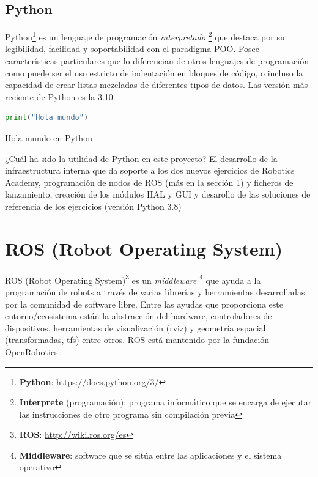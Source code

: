 \subsection{Python}
\label{subsec:python}

Python\footnote{\textbf{Python}: \url{https://docs.python.org/3/}} es un lenguaje de programación \textit{interpretado} \footnote{\textbf{Interprete} (programación): programa informático que se encarga de ejecutar las instrucciones de otro programa sin compilación previa} que destaca por su legibilidad, facilidad y soportabilidad con el paradigma POO. Posee características particulares que lo diferencian de otros lenguajes de programación como puede ser el uso estricto de indentación en bloques de código, o incluso la capacidad de crear listas mezcladas de diferentes tipos de datos. Las versión más reciente de Python es la 3.10.\\

\begin{code}[H]
\begin{lstlisting}[language=Python]
print("Hola mundo")
\end{lstlisting}
\caption[Hola mundo en Python]{Hola mundo en Python}
\label{cod:holamundo_python}
\end{code}

¿Cuál ha sido la utilidad de Python en este proyecto? El desarrollo de la infraestructura interna que da soporte a los dos nuevos ejercicios de Robotics Academy, programación de nodos de ROS (más en la sección \ref{sec:ros}) y ficheros de lanzamiento, creación de los módulos HAL y GUI y desarollo de las soluciones de referencia de los ejercicios (versión Python 3.8)\\




\section{ROS (Robot Operating System)}
\label{sec:ros}
ROS (Robot Operating System)\footnote{\textbf{ROS}: \url{http://wiki.ros.org/es}} es un \textit{middleware} \footnote{\textbf{Middleware}: software que se sitúa entre las aplicaciones y el sistema operativo} que ayuda a la programación de robots a través de varias librerías y herramientas desarrolladas por la comunidad de software libre. Entre las ayudas que proporciona este entorno/ecosistema están la abstracción del hardware, controladores de dispositivos, herramientas de visualización (rviz) y geometría espacial (transformadas, tfs) entre otros. ROS está mantenido por la fundación OpenRobotics.\\

